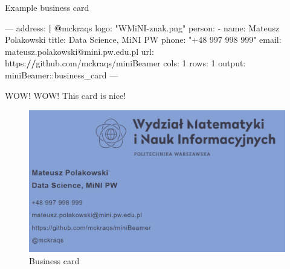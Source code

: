 \documentclass[
  ignorenonframetext,
]{beamer}
\newenvironment{Shaded}{}{}
\newcommand{\DecValTok}[1]{#1}
\newcommand{\ErrorTok}[1]{\textcolor[rgb]{1.00,0.00,0.00}{\textbf{#1}}}
\newcommand{\NormalTok}[1]{#1}
\newcommand{\OperatorTok}[1]{#1}
\newcommand{\StringTok}[1]{\textcolor[rgb]{0.00,0.50,0.50}{#1}}
\begin{document}
\begin{frame}[fragile]{Example business card}
\protect\hypertarget{example-business-card}{}

\scriptsize

\begin{Shaded}
\begin{Highlighting}[]
\OperatorTok{---}
\NormalTok{address}\OperatorTok{:}\StringTok{ }\ErrorTok{|}
\StringTok{  }\ErrorTok{@}\NormalTok{mckraqs}
\NormalTok{logo}\OperatorTok{:}\StringTok{ "WMiNI-znak.png"}
\NormalTok{person}\OperatorTok{:}
\StringTok{  }\OperatorTok{-}\StringTok{ }\NormalTok{name}\OperatorTok{:}\StringTok{ }\NormalTok{Mateusz Polakowski}
\NormalTok{    title}\OperatorTok{:}\StringTok{ }\NormalTok{Data Science, MiNI PW}
\NormalTok{    phone}\OperatorTok{:}\StringTok{ "+48 997 998 999"}
\NormalTok{    email}\OperatorTok{:}\StringTok{ }\NormalTok{mateusz.polakowski}\OperatorTok{@}\NormalTok{mini.pw.edu.pl}
\NormalTok{    url}\OperatorTok{:}\StringTok{ }\NormalTok{https}\OperatorTok{:}\ErrorTok{//}\NormalTok{github.com}\OperatorTok{/}\NormalTok{mckraqs}\OperatorTok{/}\NormalTok{miniBeamer}
\NormalTok{cols}\OperatorTok{:}\StringTok{ }\DecValTok{1}
\NormalTok{rows}\OperatorTok{:}\StringTok{ }\DecValTok{1}
\NormalTok{output}\OperatorTok{:}\StringTok{ }\NormalTok{miniBeamer}\OperatorTok{::}\NormalTok{business_card}
\OperatorTok{---}
\end{Highlighting}
\end{Shaded}

\end{frame}

\begin{frame}{WOW! WOW! This card is nice!}
\protect\hypertarget{wow-wow-this-card-is-nice}{}

\begin{figure}
\centering
\includegraphics{card.png}
\caption{Business card}
\end{figure}

\end{frame}
\end{document}
